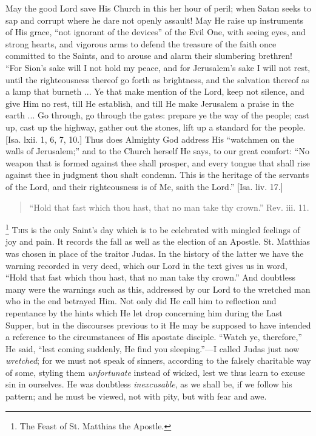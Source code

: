 May the good Lord save His Church in this her hour of peril; when
Satan seeks to sap and corrupt where he dare not openly assault! May He
raise up instruments of His grace, ``not ignorant of the
devices'' of the Evil One, with seeing eyes, and strong hearts, and
vigorous arms to defend the treasure of the faith once committed to the
Saints, and to arouse and alarm their slumbering brethren! ``For
Sion's sake will I not hold my peace, and for Jerusalem's sake I will
not rest, until the righteousness thereof go forth as brightness, and
the salvation thereof as a lamp that burneth ... Ye that make mention of
the Lord, keep not silence, and give Him no rest, till He establish, and
till He make Jerusalem a praise in the earth ... Go through, go through
the gates: prepare ye the way of the people; cast up, cast up the
highway, gather out the stones, lift up a standard for the people. [Isa.
lxii. 1, 6, 7, 10.] Thus does Almighty God address His ``watchmen on
the walls of Jerusalem;'' and to the Church herself He says, to our
great comfort: ``No weapon that is formed against thee shall
prosper, and every tongue that shall rise against thee in judgment thou
shalt condemn. This is the heritage of the servants of the Lord, and
their righteousness is of Me, saith the Lord.'' [Isa. liv. 17.]


\begin{quote}

``Hold that fast which thou hast, that no man take thy
crown.'' Rev. iii. 11.

\end{quote}

\footnote{The Feast of St. Matthias the Apostle.} T\textsc{his} is the only Saint's
day which is to be celebrated with mingled feelings of joy and pain. It
records the fall as well as the election of an Apostle. St. Matthias was
chosen in place of the traitor Judas. In the history of the latter we
have the warning recorded in very deed, which our Lord in the text gives
us in word, ``Hold that fast which thou hast, that no man take thy
crown.'' And doubtless many were the warnings such as this,
addressed by our Lord to the wretched man who in the end betrayed Him.
Not only did He call him to reflection and repentance by the hints which
He let drop concerning him during the Last Supper, but in the discourses
previous to it He may be supposed to have intended a reference to the
circumstances of His apostate disciple. ``Watch ye, therefore,''
He said, ``lest coming suddenly, He find you sleeping.''—I
called Judas just now \emph{wretched}; for we must not speak of sinners,
according to the falsely charitable way of some, styling them \emph{unfortunate}
instead of wicked, lest we thus learn to excuse sin in ourselves. He was
doubtless \emph{inexcusable}, as we shall be, if we follow his pattern;
and he must be viewed, not with pity, but with fear and awe.

